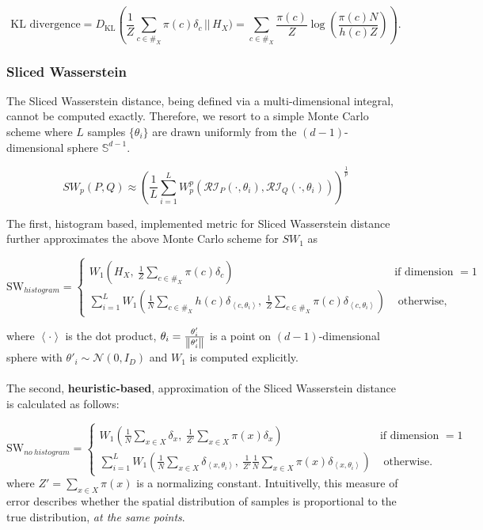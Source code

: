 \[\text{KL divergence} = D_{\text{KL}} \left( \frac 1 Z \sum_{c \in \#_X} \pi(c) \delta_c \,\bigg|\bigg| \, H_X) =  \sum_{c \in \#_X} \frac{\pi(c)}{Z} \log\left(\frac{\pi(c) N}{h(c) Z} \right)\right) .\]

\subsubsection{Sliced Wasserstein}

The Sliced Wasserstein distance, being defined via a multi-dimensional integral, cannot be computed exactly. Therefore, we resort to a simple Monte Carlo scheme where $L$ samples $\{\theta_i\}$ are drawn uniformly from the $(d-1)$-dimensional sphere $\mathbb S^{d-1}$.

$$ 
SW_p(P, Q) \approx \left( \frac 1 L \sum_{i=1}^L W_p^p\left(\mathcal{RI}_P(\cdot, \theta_i), \mathcal{RI}_Q(\cdot, \theta_i) \right) \right)^{\frac 1 p}
$$

The first, histogram based, implemented metric for Sliced Wasserstein distance further approximates the above Monte Carlo scheme for $SW_1$ as

\[\text{SW}_{histogram} = \begin{cases}
W_1 \left( H_X,\  \frac 1 Z \sum_{c \in \#_X} \pi(c) \delta_c \right) & \text{if dimension } = 1 \\
\sum_{i = 1}^L W_1 \left( \frac 1 N \sum_{c \in \#_X} h(c) \delta_{\left<c, \theta_i \right>},\  \frac 1 Z \sum_{c \in \#_X} \pi(c) \delta_{\left<c, \theta_i \right>}  \right) & \text{ otherwise, }
\end{cases}\]

where $\left< \cdot \right>$ is the dot product, $\theta_i = \frac{\theta'_i}{\norm{\theta'_i}}$ is a point on $(d-1)$-dimensional sphere with $
\theta'_i \sim \mathcal N(0, I_D)$ and $W_1$ is computed explicitly. \\\\

The second, \textbf{heuristic-based}, approximation of the Sliced Wasserstein distance is calculated as follows:

\[\text{SW}_{no\ histogram} = \begin{cases}
W_1 \left( \frac 1 N \sum_{x \in X} \delta_x,\  \frac 1 {Z'} \sum_{x \in X} \pi(x) \delta_x \right) & \text{if dimension } = 1 \\
\sum_{i = 1}^L W_1 \left(  \frac 1 N \sum_{x \in X} \delta_{\left<x, \theta_i \right>},\ \frac 1 {Z'} \frac 1 N \sum_{x \in X} \pi(x) \delta_{\left<x, \theta_i \right>}  \right) & \text{ otherwise. }
\end{cases}\]
where $Z' = \sum_{x \in X} \pi(x) $ is a normalizing constant. Intuitivelly, this measure of error describes whether the spatial distribution of samples is proportional to the true distribution, \textit{at the same points}.



